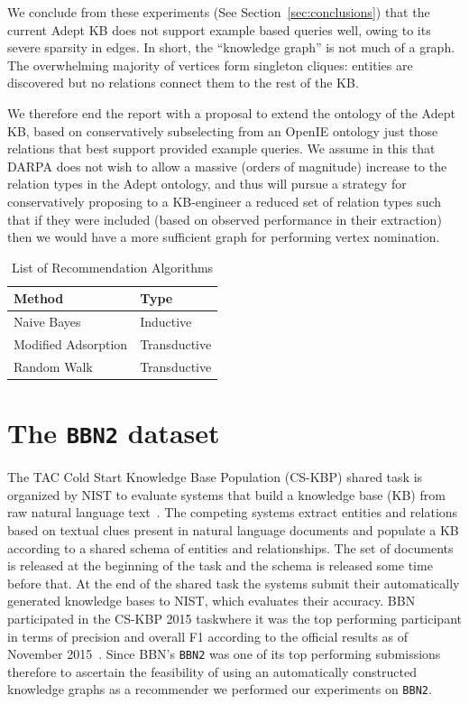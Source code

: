 \documentclass[paper=a4,fontsize=11pt]{scrartcl}
\newcommand{\Secref}[1]{Section~\ref{#1}}
\numberwithin{equation}{section}    %
\numberwithin{figure}{section}      %
\numberwithin{table}{section}       %
\newcommand{\dataset}[0]{\texttt{BBN2} dataset\xspace{}}
\newcommand{\task}{CS-KBP 2015 task\xspace{}}
\begin{document}
We conclude from these experiments (See \Secref{sec:conclusions})
that the current Adept KB does not
support example based queries well, owing to its severe sparsity
in edges. In short, the ``knowledge graph'' is not much of a graph. The
overwhelming majority of vertices form singleton cliques: entities are
discovered but no relations connect them to the rest of the KB.

We therefore end the report with a proposal to extend the ontology of
the Adept KB, based on conservatively subselecting from an OpenIE
ontology just those relations that best support provided example
queries. We assume in this that DARPA does not wish to allow a
massive (orders of magnitude) increase to the relation types in the
Adept ontology, and thus will pursue a strategy for conservatively
proposing to a KB-engineer a reduced set of relation types such that
if they were included (based on observed performance in their
extraction) then we would have a more sufficient graph for performing
vertex nomination.
\begin{table}[htbp]
  \centering
  \begin{tabular}{l l}
    Method              & Type         \\\hline
    Naive Bayes         & Inductive    \\
    Modified Adsorption & Transductive \\
    Random Walk         & Transductive \\
  \end{tabular}
  \caption{List of Recommendation Algorithms}
  \label{tab:ra}
\end{table}

\section{The \dataset{}}
\label{sec:data}
The TAC Cold Start Knowledge Base Population (CS-KBP) shared task is organized
by NIST to evaluate systems that build a knowledge base (KB) from raw natural
language text~\citep{tac2015cold}. The competing systems extract entities and relations based on
textual clues present in natural language documents and populate a KB according to a shared
schema of entities and relationships. The set of documents is released at the beginning of
the task and the schema is released some time before that.
At the end of the shared task the systems submit their
automatically generated knowledge bases to NIST, which evaluates their accuracy.
BBN participated in the \task where it was the top performing
participant in terms of precision and overall F1 according to the official
results as of November 2015~\citep{bbn2015bonan}. Since BBN's \texttt{BBN2} was one
of its top performing submissions therefore to ascertain the feasibility of using an
automatically constructed knowledge graphs as a recommender we
performed our experiments on \texttt{BBN2}.
\end{document}
